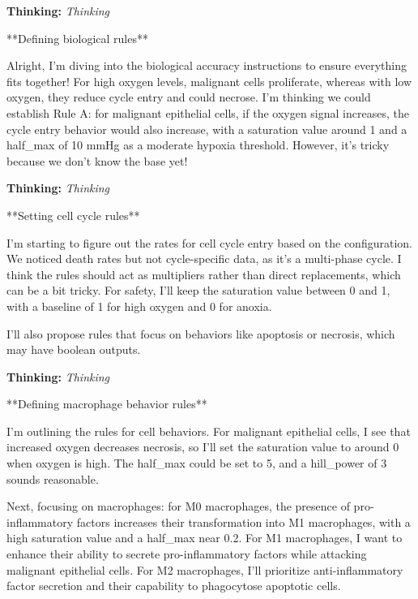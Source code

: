 \documentclass[11pt,a4paper]{article}
\begin{document}
\begin{thinkbox}
\textbf{Thinking:} \textit{Thinking}

**Defining biological rules**

Alright, I'm diving into the biological accuracy instructions to ensure everything fits together! For high oxygen levels, malignant cells proliferate, whereas with low oxygen, they reduce cycle entry and could necrose. I’m thinking we could establish Rule A: for malignant epithelial cells, if the oxygen signal increases, the cycle entry behavior would also increase, with a saturation value around 1 and a half\_max of 10 mmHg as a moderate hypoxia threshold. However, it’s tricky because we don’t know the base yet!

\end{thinkbox}
\begin{thinkbox}
\textbf{Thinking:} \textit{Thinking}

**Setting cell cycle rules**

I'm starting to figure out the rates for cell cycle entry based on the configuration. We noticed death rates but not cycle-specific data, as it’s a multi-phase cycle. I think the rules should act as multipliers rather than direct replacements, which can be a bit tricky. For safety, I'll keep the saturation value between 0 and 1, with a baseline of 1 for high oxygen and 0 for anoxia.

I’ll also propose rules that focus on behaviors like apoptosis or necrosis, which may have boolean outputs.

\end{thinkbox}
\begin{thinkbox}
\textbf{Thinking:} \textit{Thinking}

**Defining macrophage behavior rules**

I'm outlining the rules for cell behaviors. For malignant epithelial cells, I see that increased oxygen decreases necrosis, so I’ll set the saturation value to around 0 when oxygen is high. The half\_max could be set to 5, and a hill\_power of 3 sounds reasonable.

Next, focusing on macrophages: for M0 macrophages, the presence of pro-inflammatory factors increases their transformation into M1 macrophages, with a high saturation value and a half\_max near 0.2. For M1 macrophages, I want to enhance their ability to secrete pro-inflammatory factors while attacking malignant epithelial cells. For M2 macrophages, I’ll prioritize anti-inflammatory factor secretion and their capability to phagocytose apoptotic cells.

\end{thinkbox}
\end{document}
